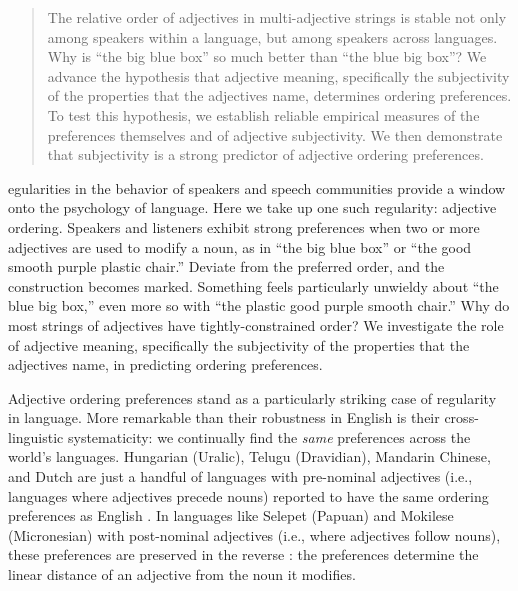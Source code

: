 \documentclass{pnastwo}
\begin{document}
\begin{article}
\begin{abstract}
{The relative order of adjectives in multi-adjective strings is stable not only among speakers within a language, but among speakers across languages. Why is ``the big blue box'' so much better than ``the blue big box''?
We advance the hypothesis that adjective meaning, specifically the subjectivity of the properties that the adjectives name, determines ordering preferences. To test this hypothesis, we establish reliable empirical measures of the preferences themselves and of adjective subjectivity. We then demonstrate that subjectivity is a strong predictor of adjective ordering preferences.}
\end{abstract}



egularities in the behavior of speakers and speech communities provide a window onto the psychology of language. Here we take up one such regularity: adjective ordering. Speakers and listeners exhibit strong preferences when two or more adjectives are used to modify a noun, as in ``the big blue box'' or ``the good smooth purple plastic chair.'' Deviate from the preferred order, and the construction becomes marked. Something feels particularly unwieldy about ``the blue big box,'' even more so with ``the plastic good purple smooth chair.'' 
Why do most strings of adjectives have tightly-constrained order?
We investigate the role of adjective meaning, specifically the subjectivity of the properties that the adjectives name, in predicting ordering preferences.

Adjective ordering preferences stand as a particularly striking case of regularity in language. More remarkable than their robustness in English is their cross-linguistic systematicity: we continually find the \emph{same} preferences across the world's languages. Hungarian (Uralic), Telugu (Dravidian), Mandarin Chinese, and Dutch are just a handful of languages with pre-nominal adjectives (i.e., languages where adjectives precede nouns) reported to have the same ordering preferences as English \cite{martin1969competence,hetzron1978,dixon1982,sproatshih1991,lapollahuang2004}.  In languages like Selepet (Papuan) and Mokilese (Micronesian) with post-nominal adjectives (i.e., where adjectives follow nouns), these preferences are preserved in the reverse \cite{hetzron1978,dixon1982,sproatshih1991}: the preferences determine the linear distance of an adjective from the noun it modifies.


\end{article}
\end{document}
